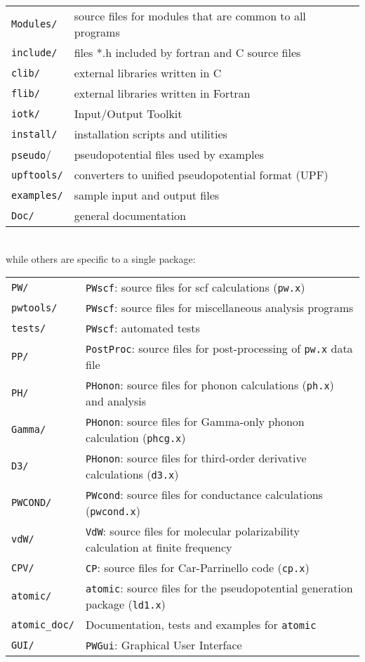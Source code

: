 \documentclass[12pt,a4paper]{article}
\def\pw.x{\texttt{pw.x}}
\def\ph.x{\texttt{ph.x}}
\def\PWscf{\texttt{PWscf}}
\def\PHonon{\texttt{PHonon}}
\def\CP{\texttt{CP}}
\def\PostProc{\texttt{PostProc}}
\begin{document}
\begin{tabular}{ll}
\texttt{Modules/} &  source files for modules that are common to all programs\\
\texttt{include/} &  files *.h included by fortran and C source files\\
\texttt{clib/}    &  external libraries written in C\\
\texttt{flib/}    &  external libraries written in Fortran\\
\texttt{iotk/ }   &  Input/Output Toolkit\\
\texttt{install/} &  installation scripts and utilities\\
\texttt{pseudo}/  &  pseudopotential files used by examples\\
\texttt{upftools/}&  converters to unified pseudopotential format (UPF)\\
\texttt{examples/}&  sample input and output files\\
\texttt{Doc/}     &  general documentation\\
\end{tabular}
\\
while others are specific to a single package:

\begin{tabular}{ll}
\texttt{PW/}      &\PWscf: source files for scf calculations (\pw.x)\\
\texttt{pwtools/} &\PWscf: source files for miscellaneous analysis programs\\
\texttt{tests/}   &\PWscf:  automated tests\\
\texttt{PP/}      &\PostProc: source files for post-processing of \pw.x
                   data file\\
\texttt{PH/}      &\PHonon: source files for phonon calculations (\ph.x)
                   and analysis\\
\texttt{Gamma/}  &\PHonon: source files for Gamma-only phonon calculation
                  (\texttt{phcg.x})\\
\texttt{D3/}     &\PHonon: source files for third-order derivative 
                  calculations (\texttt{d3.x})\\
\texttt{PWCOND/} &\texttt{PWcond}: source files for conductance calculations
                  (\texttt{pwcond.x})\\
\texttt{vdW/}    &\texttt{VdW}: source files for molecular polarizability
                  calculation at finite frequency\\
\texttt{CPV/}    &\CP: source files for Car-Parrinello code (\texttt{cp.x})\\
\texttt{atomic/} &\texttt{atomic}: source files for the pseudopotential
                   generation package (\texttt{ld1.x})\\
\texttt{atomic\_doc/} &Documentation, tests and examples for \texttt{atomic}\\
\texttt{GUI/}    & \texttt{PWGui}: Graphical User Interface\\
\end{tabular}
\end{document}
